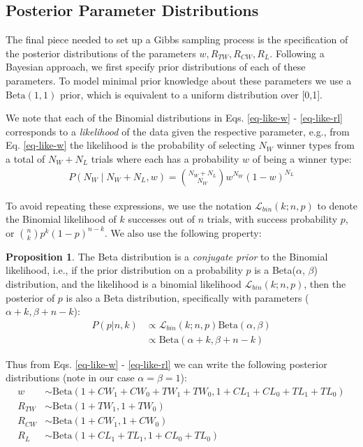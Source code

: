 \documentclass[11pt,a4paper]{article}
\theoremstyle{definition}
\theoremstyle{remark}
\theoremstyle{definition}
\theoremstyle{definition}
\theoremstyle{definition}
\theoremstyle{definition}
\theoremstyle{definition}
\theoremstyle{definition}
\newtheorem{proposition}[theorem]{Proposition}
\begin{document}
\subsection{Posterior Parameter Distributions}
The final piece needed to set up a Gibbs sampling process is the specification of the posterior distributions of the parameters $w, R_{TW}, R_{CW}, R_L$.
Following a Bayesian approach, we first specify prior distributions of each of these parameters. To model minimal prior knowledge about these parameters we use a $\text{Beta}(1,1)$ prior, which is equivalent to a uniform distribution over [0,1]. 

We note that each of the Binomial distributions in Eqs. \ref{eq-like-w} - \ref{eq-like-rl} corresponds to a \textit{likelihood} of the data given the respective parameter, e.g., from Eq. \ref{eq-like-w} the likelihood is the probability of selecting $N_W$ winner types from a total of $N_W + N_L$ trials where each has a probability $w$ of being a winner type:
\begin{eqnarray}
P(N_W \; | \; 	N_W + N_L, w) = {N_W + N_L \choose N_W} w^{N_W} (1-w)^{N_L}
\end{eqnarray}

To avoid repeating these expressions, we use the notation 
$\mathcal{L}_{bin}(k; n, p)$
 to denote the Binomial likelihood of $k$ successes out of $n$ trials, with success probability $p$, or ${n \choose k}p^k (1-p)^{n-k}$. We also use the following property: 
 
\begin{proposition} \label{prop-conj}
The Beta distribution is a \textit{conjugate prior} to the Binomial likelihood, i.e., if the prior distribution on a probability $p$ is a Beta($\alpha$, $\beta$) distribution, and the likelihood is a binomial likelihood $\mathcal{L}_{bin}(k; n,p)$, then the posterior of $p$ is also a Beta distribution, specifically with parameters ($\alpha + k, \beta + n-k$):
\begin{eqnarray}
P(p | n, k) &\propto  \mathcal{L}_{bin}(k; n,p) \text{Beta}(\alpha, \beta)\\	& \propto  \text{Beta}(\alpha + k, \beta + n-k)
\end{eqnarray}
\end{proposition}
	
Thus from Eqs. \ref{eq-like-w} - \ref{eq-like-rl} we can write the following posterior distributions (note in our case $\alpha=\beta=1$):
\newcommand{\betadist}{\text{Beta}}
\begin{equation} \label{eq-post}
\begin{split}
w &\sim  \betadist(1 + CW_1 + CW_0 + TW_1 + TW_0,
					  1 + CL_1 + CL_0 + TL_1 + TL_0) \\
R_{TW} & \sim 	\betadist(1 + TW_1, 1 + TW_0) \\
R_{CW} & \sim  \betadist(1 + CW_1, 1 + CW_0) \\
R_L & \sim  \betadist(1 + CL_1 + TL_1, 1 + CL_0 + TL_0)	
\end{split}
\end{equation}
\end{document}
